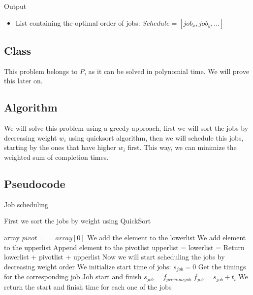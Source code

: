 \documentclass{article}
\begin{document}
Output
\begin{itemize}
 \item List containing the optimal order of jobs: $Schedule = [job_x,job_y,...]$ 
\end{itemize}

\subsection*{Class}

This problem belongs to \textit{P}, as it can be solved in polynomial time. We will prove this later on.

\subsection*{Algorithm}

We will solve this problem using a greedy approach, first we will sort the jobs by decreasing weight $w_i$ using quicksort algorithm, then we will schedule this jobs, starting by the ones that have higher $w_i$ first. This way, we can minimize the weighted sum of completion times.

\subsection*{Pseudocode}

\begin{algorithm}[H]
\caption{Job scheduling}
\begin{algorithmic}[1]
\State First we sort the jobs by weight using QuickSort

  \Return array
 \EndIf
  \State $pivot == array[0]$
    \State We add the element to the lowerlist
   \EndIf
    \State We add element to the upperlist
   \EndIf
    \State Append element to the pivotlist
   \EndIf
  \EndFor
  \State upperlist = 
  \State lowerlist = 
 \EndIf
 \State Return lowerlist + pivotlist + upperlist
\EndFunction
\State
\State Now we will start scheduling the jobs by decreasing weight order
\State We initialize start time of jobs: $s_{job} = 0$
 \State Get the timings for the corresponding job
 \State
 \State Job start and finish
 \State $s_{job} = f_{previous job}$
 \State $f_{job} = s_{job} + t_{i}$
 \State
 \State We return the start and finish time for each one of the jobs

\EndWhile
\end{algorithmic}
\end{algorithm}
\end{document}
